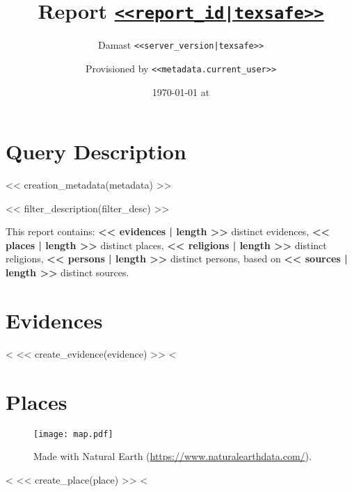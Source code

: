 \documentclass[fontsize=10pt,toc=chapterentrywithdots]{scrreprt}
\begin{document}
\title{Report \texttt{\href{<<report_url|texsafe>>}{<<report_id|texsafe>>}}}
\subtitle{Damast \texttt{<<server_version|texsafe>>}}
\date{\today{} at \thistime}
\author{Provisioned by \texttt{<<metadata.current_user>>}}
\publishers{VIS, University of Stuttgart, Germany}

\maketitle

\pagestyle{scrheadings}
\cfoot*{}
\chead*{}
\ihead*{\textsc{\rightmark}}

\tableofcontents

\chapter{Query Description}
\label{sec:filters}

<< creation_metadata(metadata) >>

<< filter_description(filter_desc) >>

This report contains:
\textbf{<< evidences | length >>} distinct evidences,
\textbf{<< places | length >>} distinct places,
\textbf{<< religions | length >>} distinct religions,
\textbf{<< persons | length >>} distinct persons,
based on \textbf{<< sources | length >>} distinct sources.


\clearpage
\chapter{Evidences}
\label{sec:evidences}

<%
  << create_evidence(evidence) >>
<%


\clearpage
\chapter{Places}
\label{sec:places}

\begin{figure}[H]
  \texttt{[image: map.pdf]}
  \caption{Made with Natural Earth (\url{https://www.naturalearthdata.com/}).}
\end{figure}

<%
<< create_place(place) >>
<%
\end{document}

